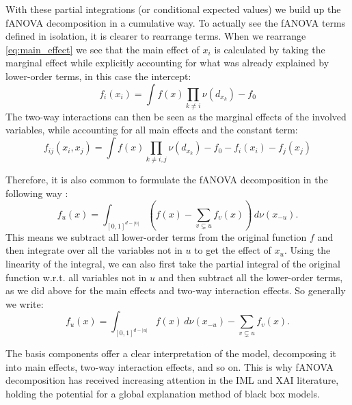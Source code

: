 With these partial integrations (or conditional expected values) we build up the fANOVA decomposition in a cumulative way. To actually see the fANOVA terms defined in isolation, it is clearer to rearrange terms. When we rearrange \autoref{eq:main_effect} we see that the main effect of $x_i$ is calculated by taking the marginal effect while explicitly accounting for what was already explained by lower-order terms, in this case the intercept:
\begin{equation}
    f_i(x_i) = \int f(x) \prod_{k \neq i} \nu(d_{x_{k}}) - f_0
    \label{eq:main_effect_rearranged}
\end{equation}
The two-way interactions can then be seen as the marginal effects of the involved variables, while accounting for all main effects and the constant term:
\begin{equation}
    f_{ij}(x_i,x_j) = \int f(x) \prod_{k \neq i,j} \nu(d_{x_{k}}) - f_0 - f_i(x_i) - f_j(x_j) 
    \label{eq:interaction_effects}
\end{equation}

Therefore, it is also common to formulate the fANOVA decomposition in the following way \citep{hooker2007,hooker2004}:
\begin{equation}
    f_u(x) = \int_{[0,1]^{d - |u|}} \left( f(x) - \sum_{v \subsetneq u} f_v(x) \right) \, d\nu(x_{-u}).
\end{equation}
This means we subtract all lower-order terms from the original function $f$ and then integrate over all the variables not in $u$ to get the effect of $x_u$. Using the linearity of the integral, we can also first take the partial integral of the original function w.r.t. all variables not in $u$ and then subtract all the lower-order terms, as we did above for the main effects and two-way interaction effects. So generally we write:
\begin{equation}
    f_u(x) = \int_{[0,1]^{d - |u|}} f(x) \, d\nu(x_{-u}) - \sum_{v \subsetneq u} f_v(x).
\end{equation}

The basis components offer a clear interpretation of the model, decomposing it into main effects, two-way interaction effects, and so on. This is why fANOVA decomposition has received increasing attention in the IML and XAI literature, holding the potential for a global explanation method of black box models.\par

